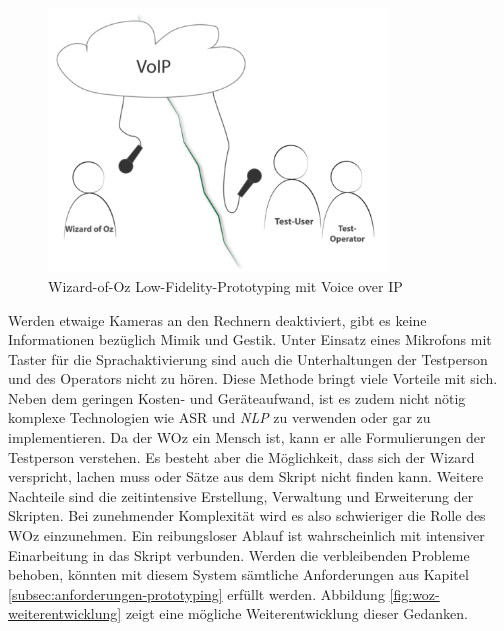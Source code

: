 \begin{figure}[!htb]
    \centering
    \includegraphics[width=0.8\textwidth]{bilder/3_wozLoFiVoIP.png}
    \caption{Wizard-of-Oz Low-Fidelity-Prototyping mit Voice over IP}
    \label{fig:woz-lofi-voip}
\end{figure}

Werden etwaige Kameras an den Rechnern deaktiviert, gibt es keine Informationen bezüglich Mimik und Gestik. Unter Einsatz eines Mikrofons mit Taster für die Sprachaktivierung sind auch die Unterhaltungen der Testperson und des Operators nicht zu hören. Diese Methode bringt viele Vorteile mit sich. Neben dem geringen Kosten- und Geräteaufwand, ist es zudem nicht nötig komplexe Technologien wie \ac{ASR} und \textit{NLP} zu verwenden oder gar zu implementieren. Da der \ac{WOz} ein Mensch ist, kann er alle Formulierungen der Testperson verstehen. Es besteht aber die Möglichkeit, dass sich der Wizard verspricht, lachen muss oder Sätze aus dem Skript nicht finden kann. Weitere Nachteile sind die zeitintensive Erstellung, Verwaltung und Erweiterung der Skripten. Bei zunehmender Komplexität wird es also schwieriger die Rolle des \ac{WOz} einzunehmen. Ein reibungsloser Ablauf ist wahrscheinlich mit intensiver Einarbeitung in das Skript verbunden. Werden die verbleibenden Probleme behoben, könnten mit diesem System sämtliche Anforderungen aus Kapitel \ref{subsec:anforderungen-prototyping} erfüllt werden. Abbildung \ref{fig:woz-weiterentwicklung} zeigt eine mögliche Weiterentwicklung dieser Gedanken.

